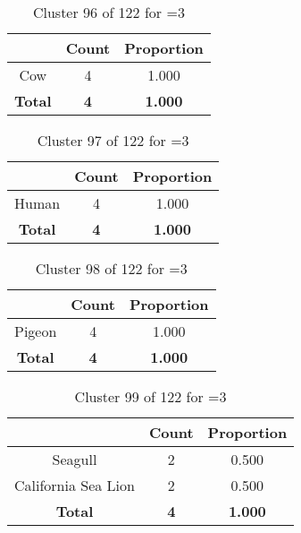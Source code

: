 \begin{table}[ht!]
\centering
\begin{tabular}{|c|c|c|}
\hline
\bf \Spec{} &\bf Count &\bf Proportion\\ \hline \hline
Cow & 4 & 1.000\\ \hline
\hline
\bf Total & \bf 4 & \bf 1.000\\ \hline
\end{tabular}
\label{tab:cluster:96:3}
\caption{Cluster 96 of 122 for \minneigh{}=3}
\end{table}

\begin{table}[ht!]
\centering
\begin{tabular}{|c|c|c|}
\hline
\bf \Spec{} &\bf Count &\bf Proportion\\ \hline \hline
Human & 4 & 1.000\\ \hline
\hline
\bf Total & \bf 4 & \bf 1.000\\ \hline
\end{tabular}
\label{tab:cluster:97:3}
\caption{Cluster 97 of 122 for \minneigh{}=3}
\end{table}

\begin{table}[ht!]
\centering
\begin{tabular}{|c|c|c|}
\hline
\bf \Spec{} &\bf Count &\bf Proportion\\ \hline \hline
Pigeon & 4 & 1.000\\ \hline
\hline
\bf Total & \bf 4 & \bf 1.000\\ \hline
\end{tabular}
\label{tab:cluster:98:3}
\caption{Cluster 98 of 122 for \minneigh{}=3}
\end{table}

\begin{table}[ht!]
\centering
\begin{tabular}{|c|c|c|}
\hline
\bf \Spec{} &\bf Count &\bf Proportion\\ \hline \hline
Seagull & 2 & 0.500\\ \hline
California Sea Lion & 2 & 0.500\\ \hline
\hline
\bf Total & \bf 4 & \bf 1.000\\ \hline
\end{tabular}
\label{tab:cluster:99:3}
\caption{Cluster 99 of 122 for \minneigh{}=3}
\end{table}

